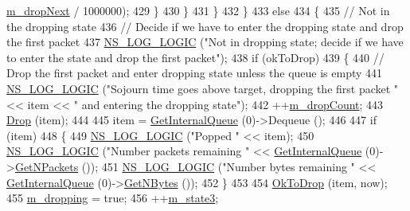 \begin{DoxyCode}
      \hyperlink{classns3_1_1CoDelQueueDisc_afb812be3b2ea5064053bdc884144965d}{m\_dropNext} / 1000000);
429                 \}
430             \}
431         \}
432     \}
433   \textcolor{keywordflow}{else}
434     \{
435       \textcolor{comment}{// Not in the dropping state}
436       \textcolor{comment}{// Decide if we have to enter the dropping state and drop the first packet}
437       \hyperlink{group__logging_ga88acd260151caf2db9c0fc84997f45ce}{NS\_LOG\_LOGIC} (\textcolor{stringliteral}{"Not in dropping state; decide if we have to enter the state and drop the
       first packet"});
438       \textcolor{keywordflow}{if} (okToDrop)
439         \{
440           \textcolor{comment}{// Drop the first packet and enter dropping state unless the queue is empty}
441           \hyperlink{group__logging_ga88acd260151caf2db9c0fc84997f45ce}{NS\_LOG\_LOGIC} (\textcolor{stringliteral}{"Sojourn time goes above target, dropping the first packet "} << item <<
       \textcolor{stringliteral}{" and entering the dropping state"});
442           ++\hyperlink{classns3_1_1CoDelQueueDisc_ae61e9b4326d0f0b7db697c1e44e1336f}{m\_dropCount};
443           \hyperlink{classns3_1_1QueueDisc_a4e8bbd3afbd927df3342dd015f30b08c}{Drop} (item);
444 
445           item = \hyperlink{classns3_1_1QueueDisc_adf09b498c07c5677c26ea4b8309def74}{GetInternalQueue} (0)->Dequeue ();
446 
447           \textcolor{keywordflow}{if} (item)
448             \{
449               \hyperlink{group__logging_ga88acd260151caf2db9c0fc84997f45ce}{NS\_LOG\_LOGIC} (\textcolor{stringliteral}{"Popped "} << item);
450               \hyperlink{group__logging_ga88acd260151caf2db9c0fc84997f45ce}{NS\_LOG\_LOGIC} (\textcolor{stringliteral}{"Number packets remaining "} << 
      \hyperlink{classns3_1_1QueueDisc_adf09b498c07c5677c26ea4b8309def74}{GetInternalQueue} (0)->\hyperlink{classns3_1_1QueueDisc_a6ee992f32c1671512f0948fd6cc46a7e}{GetNPackets} ());
451               \hyperlink{group__logging_ga88acd260151caf2db9c0fc84997f45ce}{NS\_LOG\_LOGIC} (\textcolor{stringliteral}{"Number bytes remaining "} << 
      \hyperlink{classns3_1_1QueueDisc_adf09b498c07c5677c26ea4b8309def74}{GetInternalQueue} (0)->\hyperlink{classns3_1_1QueueDisc_ac87d3bbf7381d64808f6764bdfd812e5}{GetNBytes} ());
452             \}
453 
454           \hyperlink{classns3_1_1CoDelQueueDisc_a9b3e4ad53210fe2b1098fc799e139ff0}{OkToDrop} (item, now);
455           \hyperlink{classns3_1_1CoDelQueueDisc_ae6b02968204bd5c2e6d68e532ce679c4}{m\_dropping} = \textcolor{keyword}{true};
456           ++\hyperlink{classns3_1_1CoDelQueueDisc_a2d42fc65424271f253f395283ed0ee2d}{m\_state3};

\end{DoxyCode}

